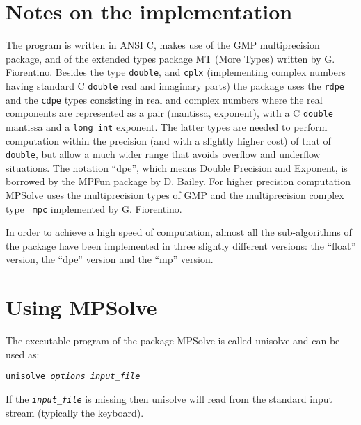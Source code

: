 \documentclass{article}
\begin{document}
\section{Notes on the implementation}
The program is written in ANSI C, makes use of the GMP multiprecision
package, and of the extended types package MT (More Types) written by
G. Fiorentino.  Besides the type {\tt double}, and {\tt cplx}
(implementing complex numbers having standard C {\tt double} real and
imaginary parts) the package uses the {\tt rdpe} and the {\tt cdpe}
types consisting in real and complex numbers where the real components
are represented as a pair (mantissa, exponent), with a C {\tt double}
mantissa and a {\tt long int} exponent. The latter types are needed to
perform computation within the precision (and with a slightly higher
cost) of that of {\tt double}, but allow a much wider range that
avoids overflow and underflow situations. The notation ``dpe'', which
means Double Precision and Exponent, is borrowed by the MPFun package
by D. Bailey.  For higher precision computation MPSolve uses the
multiprecision types of GMP and the multiprecision complex type {\tt
mpc} implemented by G. Fiorentino.

In order to achieve a high speed of computation, almost all the
sub-algorithms of the package have been implemented in three slightly
different versions: the ``float'' version, the ``dpe'' version and the
``mp'' version.

\section{Using  MPSolve}
The executable program of the package MPSolve is called unisolve and can be
used as:
\begin{center}
 {\tt unisolve {\em options} {\em input\_file}}
\end{center}

If the {\tt \em input\_file} is missing then unisolve will read from 
the standard input stream (typically the keyboard).
\end{document}
